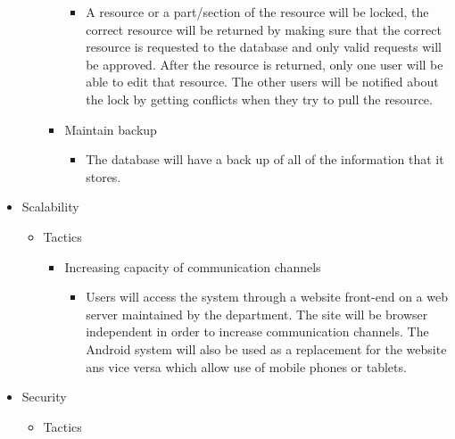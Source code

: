 \documentclass{article}
\begin{document}
\begin{itemize}
\begin{itemize}
\begin{itemize}
					\begin{itemize}
						\item A resource or a part/section of the resource will be locked, the correct resource will be returned by making sure that the correct resource is requested to the database and only valid requests will be approved. After the resource is returned, only one user will be able to edit that resource. The other users will be notified about the lock by getting conflicts when they try to pull the resource.
					\end{itemize}
										
				\item Maintain backup
				
					\begin{itemize}
						\item The database will have a back up of all of the information that it stores.
					\end{itemize}
								

			\end{itemize}
						
		\end{itemize}
		\item Scalability
		\begin{itemize}
			
			\item Tactics
			\begin{itemize}

				\item Increasing capacity of communication channels
					
					\begin{itemize}
						\item Users will access the system through a website front-end on a web server maintained by the department. The site will be browser independent in order to increase communication channels. The Android system will also be used as a replacement for the website ans vice versa which allow use of mobile phones or tablets.
					\end{itemize}

			\end{itemize}
				
				
		\cleardoublepage
		
						
		\end{itemize}
		\item Security
		\begin{itemize}
			
			\item Tactics
			\begin{itemize}
				

\end{itemize}
\end{itemize}
\end{itemize}
\end{document}
